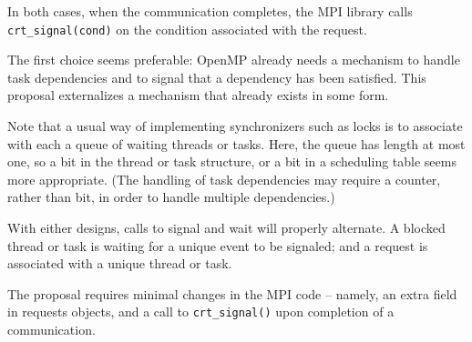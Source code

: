 In both cases, when the communication completes, the MPI library calls 
\texttt{crt\_signal(cond)} on the condition associated with the request.

The first choice seems preferable: OpenMP already needs a mechanism to handle 
task dependencies and to signal that a dependency has been satisfied. This 
proposal externalizes a mechanism that already exists in some form. 
 
Note that a usual way of implementing synchronizers such as locks is to 
associate with each a queue of waiting threads or tasks. Here, the queue has 
length at most one, so a bit in the thread or task structure, or a bit in a 
scheduling table seems more appropriate. (The handling of task dependencies may 
require a counter, rather than bit, in order to handle multiple dependencies.) 

With either designs, calls to signal 
and wait will properly alternate. A blocked thread or task is waiting for a 
unique event to be signaled; and a request is associated with a unique thread 
or task.

The proposal requires minimal changes in the MPI code -- namely, an extra field 
in requests objects, and a call to \texttt{crt\_signal()} upon completion of a 
communication.
